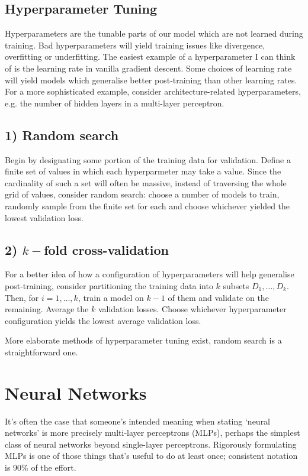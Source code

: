 \documentclass[11pt]{article}
\begin{document}
\subsection{Hyperparameter Tuning}
Hyperparameters are the tunable parts of our model which are not learned during training. Bad hyperparameters will yield training issues like divergence, overfitting or underfitting. The easiest example of a hyperparameter I can think of is the learning rate in vanilla gradient descent. Some choices of learning rate will yield models which generalise better post-training than other learning rates. For a more sophisticated example, consider architecture-related hyperparameters, e.g. the number of hidden layers in a multi-layer perceptron.

\subsection*{1) Random search}
Begin by designating some portion of the training data for validation. Define a finite set of values in which each hyperparmeter may take a value. Since the cardinality of such a set will often be massive, instead of traversing the whole grid of values, consider random search: choose a number of models to train, randomly sample from the finite set for each and choose whichever yielded the lowest validation loss.

\subsection*{2) $k-$fold cross-validation}
For a better idea of how a configuration of hyperparameters will help generalise post-training, consider partitioning the training data into $k$ subsets $D_1,\dots,D_k$. Then, for $i=1,\dots,k$, train a model on $k-1$ of them and validate on the remaining. Average the $k$ validation losses. Choose whichever hyperparameter configuration yields the lowest average validation loss.

More elaborate methods of hyperparameter tuning exist, random search is a straightforward one.


\section{Neural Networks}
It's often the case that someone's intended meaning when stating `neural networks' is more precisely multi-layer perceptrons (MLPs), perhaps the simplest class of neural networks beyond single-layer perceptrons. Rigorously formulating MLPs is one of those things that's useful to do at least once; consistent notation is 90\% of the effort.
\end{document}
